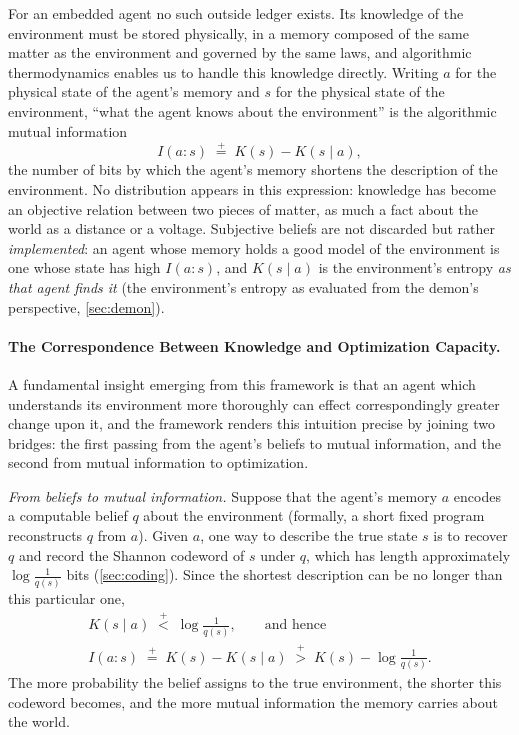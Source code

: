 \documentclass[11pt]{article}
\newcommand{\plt}{\mathrel{\stackrel{+}{<}}}
\newcommand{\pgt}{\mathrel{\stackrel{+}{>}}}
\newcommand{\peq}{\mathrel{\stackrel{+}{=}}}
\begin{document}
For an embedded agent no such outside ledger exists. Its knowledge of the environment must be stored physically, in a memory composed of the same matter as the environment and governed by the same laws, and algorithmic thermodynamics enables us to handle this knowledge directly. Writing $a$ for the physical state of the agent's memory and $s$ for the physical state of the environment, ``what the agent knows about the environment'' is the algorithmic mutual information
\[
I(a : s) \;\peq\; K(s) - K(s \mid a),
\]
the number of bits by which the agent's memory shortens the description of the environment. No distribution appears in this expression: knowledge has become an objective relation between two pieces of matter, as much a fact about the world as a distance or a voltage. Subjective beliefs are not discarded but rather \emph{implemented}: an agent whose memory holds a good model of the environment is one whose state has high $I(a:s)$, and $K(s \mid a)$ is the environment's entropy \emph{as that agent finds it} (the environment's entropy as evaluated from the demon's perspective, \cref{sec:demon}).

\paragraph{The Correspondence Between Knowledge and Optimization Capacity.} A fundamental insight emerging from this framework is that an agent which understands its environment more thoroughly can effect correspondingly greater change upon it, and the framework renders this intuition precise by joining two bridges: the first passing from the agent's beliefs to mutual information, and the second from mutual information to optimization.

\emph{From beliefs to mutual information.} Suppose that the agent's memory $a$ encodes a computable belief $q$ about the environment (formally, a short fixed program reconstructs $q$ from $a$). Given $a$, one way to describe the true state $s$ is to recover $q$ and record the Shannon codeword of $s$ under $q$, which has length approximately $\log \tfrac{1}{q(s)}$ bits (\cref{sec:coding}). Since the shortest description can be no longer than this particular one,
\begin{gather*}
K(s \mid a) \;\plt\; \log \frac{1}{q(s)},
\qquad\text{and hence}\\
I(a : s) \;\peq\; K(s) - K(s \mid a) \;\pgt\; K(s) - \log \frac{1}{q(s)}.
\end{gather*}
The more probability the belief assigns to the true environment, the shorter this codeword becomes, and the more mutual information the memory carries about the world.
\end{document}
